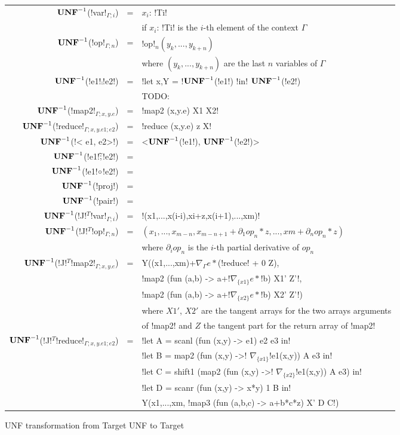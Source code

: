 \begin{figure*}[t]
    \begin{tabular}{r c l}
    $\mathbf{UNF}^{-1}$(!var!$_{\Gamma;i}$) &=& $x_i$: !Ti! \\
    && if $x_i$: !Ti! is the $i$-th element of the context $\Gamma$ \\
    $\mathbf{UNF}^{-1}$(!op!$_{\Gamma;n}$) &=& !op!$_n(y_k,...,y_{k+n})$ \\
    && where $(y_k,...,y_{k+n})$ are the last $n$ variables of $\Gamma$ \\ 
    $\mathbf{UNF}^{-1}$(!e1!$\comp$!e2!) &=& !let x,Y = !$\mathbf{UNF}^{-1}$(!e1!) !in! $\mathbf{UNF}^{-1}$(!e2!) \\ 
    && TODO: \\ 
    $\mathbf{UNF}^{-1}$(!map2!$_{\Gamma;x,y.e}$) &=& !map2 (x,y.e) X1 X2! \\ 
    $\mathbf{UNF}^{-1}$(!reduce!$_{\Gamma;x,y.e1;e2}$) &=& !reduce (x,y.e) z X! \\ 
    $\mathbf{UNF}^{-1}$(!< e1, e2>!) &=& <$\mathbf{UNF}^{-1}$(!e1!), $\mathbf{UNF}^{-1}$(!e2!)> \\
    $\mathbf{UNF}^{-1}$(!e1!$\widetilde{;}$!e2!) &=& \\
    $\mathbf{UNF}^{-1}$(!e1!$\circ$!e2!) &=& \\
    $\mathbf{UNF}^{-1}$(!proj!) &=& \\
    $\mathbf{UNF}^{-1}$(!pair!) &=& \\
    $\mathbf{UNF}^{-1}$(!J!$^T$!var!$_{\Gamma;i}$) &=& !(x1,...,x(i-i),xi+z,x(i+1),...,xm)! \\
    $\mathbf{UNF}^{-1}$(!J!$^T$!op!$_{\Gamma;n}$) &=& $(x_1,...,x_{m-n},x_{m-n+1}+\partial_1op_n*z,...,xm+\partial_nop_n*z)$ \\
    && where $\partial_iop_n$ is the $i$-th partial derivative of $op_n$ \\
    $\mathbf{UNF}^{-1}$(!J!$^T$!map2!$_{\Gamma;x,y.e}$) &=&  Y((x1,...,xm)+$\nabla_{\Gamma}e *$(!reduce! + 0 Z),\\
    && !map2 (fun (a,b) -> a+!$\nabla_{\{x1\}}e *$!b) X1' Z'!, \\
    && !map2 (fun (a,b) -> a+!$\nabla_{\{x2\}}e *$!b) X2' Z'!) \\
    && where $X1'$, $X2'$ are the tangent arrays for the two arrays arguments \\
    && of !map2! and $Z$ the tangent part for the return array of !map2! \\
    $\mathbf{UNF}^{-1}$(!J!$^T$!reduce!$_{\Gamma;x,y.e1;e2}$) &=& !let A = scanl (fun (x,y) -> e1) e2 e3 in! \\
    && !let B = map2 (fun (x,y) ->! $\nabla_{\{x1\}}$!e1(x,y)) A e3 in!\\
    && !let C = shift1 (map2 (fun (x,y) ->! $\nabla_{\{x2\}}$!e1(x,y)) A e3) in!\\
    && !let D = scanr (fun (x,y) -> x*y) 1 B in!\\
    && Y(x1,...,xm, !map3 (fun (a,b,c) -> a+b*c*z) X' D C!)
    \end{tabular}
    \caption{UNF transformation from Target UNF to Target}
    \label{fig:unf_to_target}
    \end{figure*}